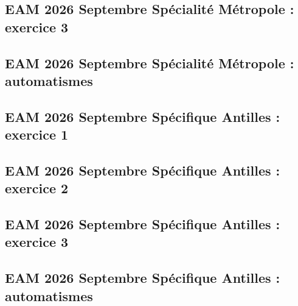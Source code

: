 \documentclass[lang=fr,edition=teacher,layout=sheet]{mxbook}
\begin{document}
\begingroup\endgroup
\par\bigskip
{}\subsection*{EAM 2026 Septembre Spécialité Métropole : exercice 3}
\begingroup\endgroup
\par\bigskip
{}\subsection*{EAM 2026 Septembre Spécialité Métropole : automatismes}
\begingroup\endgroup
\par\bigskip
{}\subsection*{EAM 2026 Septembre Spécifique Antilles : exercice 1}
\begingroup\endgroup
\par\bigskip
{}\subsection*{EAM 2026 Septembre Spécifique Antilles : exercice 2}
\begingroup\endgroup
\par\bigskip
{}\subsection*{EAM 2026 Septembre Spécifique Antilles : exercice 3}
\begingroup\endgroup
\par\bigskip
{}\subsection*{EAM 2026 Septembre Spécifique Antilles : automatismes}
\begingroup\endgroup
\end{document}
